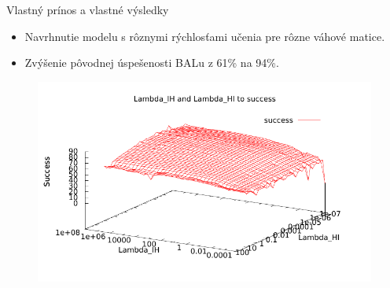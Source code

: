 \documentclass[xcolor=dvipsnames]{beamer}
\begin{document}
\begin{frame}{Vlastný prínos a vlastné výsledky}
  \begin{itemize}
    \item Navrhnutie modelu s rôznymi rýchlosťami učenia pre rôzne váhové matice.
    \item Zvýšenie pôvodnej úspešenosti BALu z 61\% na 94\%. 
  \end{itemize} 
  
  \begin{figure}[h!]  
    \centering
    \vspace{-8pt} 
    \includegraphics[scale=0.8]{img/success_to_lambdas.pdf}
  \end{figure} 
\end{frame}
\end{document}
